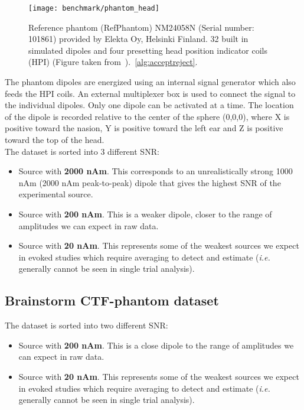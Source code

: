 \begin{figure}[tb]
   \centering
\texttt{[image: benchmark/phantom\_head]}
\caption{Reference phantom (RefPhantom) NM24058N (Serial number: 101861) provided by Elekta Oy, Helsinki Finland. 32 built in simulated dipoles and four presetting head position indicator coils (HPI) (Figure taken from~\cite{hazim2015magnetoencephalography}).~\ref{alg:acceptreject}.}
   \label{fig:phantom_head}
\end{figure}

The phantom dipoles are energized using an internal signal generator which also feeds the HPI coils. An external multiplexer box is used to connect the signal to the individual dipoles. Only one dipole can be activated at a time. The location of the dipole is recorded relative to the center of the sphere (0,0,0), where X is positive toward the nasion, Y is positive toward the left ear and Z is positive toward the top of the head.\\

The dataset is sorted into 3 different \ac{SNR}:
\begin{itemize}
\item Source with \textbf{2000 nAm}. This corresponds to an unrealistically strong 1000 nAm (2000 nAm peak-to-peak) dipole that gives the highest SNR of the experimental source.
\item Source with \textbf{200 nAm}. This is a weaker dipole, closer to the range of amplitudes we can expect in raw data.
\item Source with \textbf{20 nAm}. This represents some of the weakest sources we expect in evoked studies which require averaging to detect and estimate (\textit{i.e.} generally cannot be seen in single trial analysis).
\end{itemize}

\subsection{Brainstorm CTF-phantom dataset}

The dataset is sorted into two different SNR:
\begin{itemize}
\item Source with \textbf{200 nAm}. This is a close dipole to the range of amplitudes we can expect in raw data.
\item Source with \textbf{20 nAm}. This represents some of the weakest sources we expect in evoked studies which require averaging to detect and estimate (\textit{i.e.} generally cannot be seen in single trial analysis).
\end{itemize}


